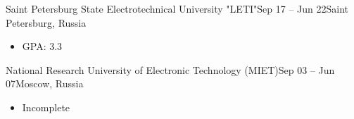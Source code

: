 \documentclass[10pt,a4paper,ragged2e,withhyper]{altacv}
\begin{document}
\begin{paracol}{2}
            {Saint Petersburg State Electrotechnical University "LETI"}{Sep 17 -- Jun 22}{Saint Petersburg, Russia}
            \begin{itemize}
                \item GPA: 3.3
            \end{itemize}
            \divider

            {National Research University of Electronic Technology (MIET)}{Sep 03 -- Jun 07}{Moscow, Russia}
            \begin{itemize}
                \item Incomplete
            \end{itemize}


    \end{paracol}
\end{document}

